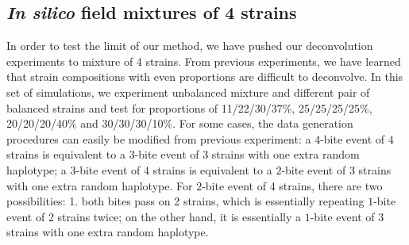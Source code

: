 \documentclass[9pt]{article}
\begin{document}
\subsection{{\it In silico} field mixtures of 4 strains}

In order to test the limit of our method, we have pushed our deconvolution experiments to mixture of 4 strains. From previous experiments, we have learned that strain compositions with even proportions are difficult to deconvolve. In this set of simulations, we experiment unbalanced mixture and different pair of balanced strains and test for proportions of 11/22/30/37\%, 25/25/25/25\%, 20/20/20/40\% and 30/30/30/10\%. For some cases, the data generation procedures can easily be modified from previous experiment: a $4$-bite event of $4$ strains is equivalent to a $3$-bite event of 3 strains with one extra random haplotype; a $3$-bite event of $4$ strains is equivalent to a $2$-bite event of 3 strains with one extra random haplotype. For $2$-bite event of 4 strains, there are two possibilities: 1. both bites pass on 2 strains, which is essentially repeating $1$-bite event of 2 strains twice; on the other hand, it is essentially a $1$-bite event of 3 strains with one extra random haplotype.





%

\end{document}
